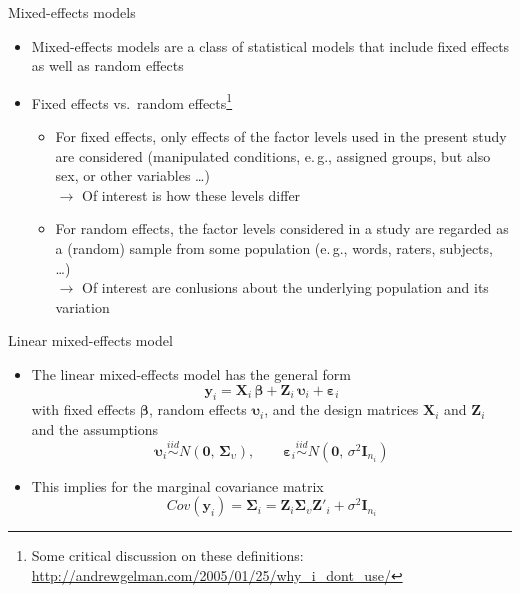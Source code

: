 \documentclass[aspectratio=169]{beamer}
\newcommand{\vect}[1]{\mathbf{#1}}
\newcommand{\mat}[1]{\mathbf{#1}}
\newcommand{\gvect}[1]{\boldsymbol{#1}}
\newcommand{\gmat}[1]{\boldsymbol{#1}}
\begin{document}
\begin{frame}{Mixed-effects models}
  \begin{itemize}
    \item Mixed-effects models are a class of statistical models that
      include fixed effects as well as random effects
    \item Fixed effects vs.\ random effects\footnote{Some critical
      discussion on these definitions:
      \url{http://andrewgelman.com/2005/01/25/why_i_dont_use/}}
    \begin{itemize}
      \item For fixed effects, only effects of the factor levels used in the
        present study are considered (manipulated conditions, e.\,g., assigned
        groups, but also sex, or other variables \dots)\\[1ex]

        $\to$ Of interest is how these levels differ\\[1ex]

      \item For random effects, the factor levels considered in a study are
        regarded as a (random) sample from some population (e.\,g., words,
        raters, subjects, \dots)\\[1ex]

        $\to$ Of interest are conlusions about the underlying population and its
        variation
    \end{itemize}
  \end{itemize}
\end{frame}

\begin{frame}{Linear mixed-effects model}
  \begin{itemize}
    \item The linear mixed-effects model has the general form
\[
  \vect{y}_i = \mat{X}_i \, \gvect{\beta} + \mat{Z}_i \, \gvect{\upsilon}_i +
               \gvect{\varepsilon}_i
\]
with fixed effects $\gvect{\beta}$, random effects
$\gvect{\upsilon}_i$, and the design matrices $\mat{X}_i$ and $\mat{Z}_i$
  and the assumptions
\[
  \gvect{\upsilon}_i \overset{iid}{\sim}N(\vect{0}, \, \gmat{\Sigma}_\upsilon),
      \qquad
  \gvect{\varepsilon}_i \overset{iid}{\sim} N(\vect{0}, \, \sigma^2 \mat{I}_{n_i})
\]
\item This implies for the marginal covariance matrix
\[
  Cov(\vect{y}_i) = \gmat{\Sigma}_i =
    \mat{Z}_i \gmat{\Sigma}_\upsilon \mat{Z}'_i + \sigma^2 \mat{I}_{n_i}
\]
  \end{itemize}
\end{frame}
\end{document}
